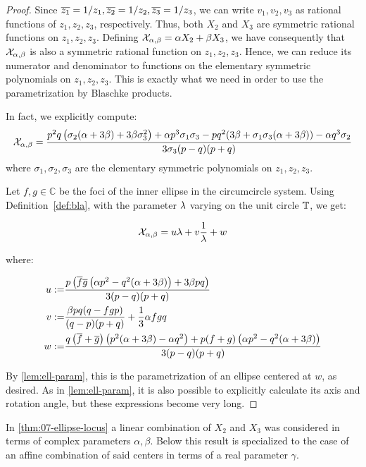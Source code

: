 \begin{proof}
Since $\overline{z_1}=1/z_1,\overline{z_2}=1/z_2,\overline{z_3}=1/z_3$, we can write $v_1,v_2,v_3$ as rational functions of $z_1,z_2,z_3$, respectively. Thus, both $X_2$ and $X_3$ are symmetric rational functions on $z_1,z_2,z_3$. Defining $\mathcal{X}_{\alpha,\beta}=\alpha X_2+\beta X_3$, we have consequently that $\mathcal{X}_{\alpha,\beta}$ is also a symmetric rational function on $z_1,z_2,z_3$. Hence, we can reduce its numerator and denominator to functions on the elementary symmetric polynomials on $z_1,z_2,z_3$. This is exactly what we need in order to use the parametrization by Blaschke products.

In fact, we explicitly compute:
\[  \mathcal{X}_{\alpha,\beta}= \frac{p^2 q \left(\sigma_2 (\alpha +3 \beta )+3 \beta  \sigma_3^2\right)+\alpha  p^3 \sigma_1 \sigma_3-p q^2 (3 \beta +\sigma_1 \sigma_3 (\alpha +3 \beta ))-\alpha  q^3 \sigma_2}{3 \sigma_3 (p-q) (p+q)}\]
where $\sigma_1,\sigma_2,\sigma_3$ are the elementary symmetric polynomials on $z_1,z_2,z_3$.

Let $f,g\in\mathbb{C}$ be the foci of the inner ellipse in the circumcircle system. Using Definition~\ref{def:bla}, with the parameter $\lambda$ varying on the unit circle $\mathbb{T}$, we get:

\begin{equation}
\mathcal{X}_{\alpha,\beta}= u \lambda+v\frac{1}{\lambda}+w
\label{eqn:xi-param}
\end{equation}

\noindent where:

\begin{align*}
    u:=&\frac{p \left(\overline{f} \overline{g} \left(\alpha  p^2-q^2 (\alpha +3 \beta )\right)+3 \beta  p q\right)}{3 (p-q) (p+q)}\\
    v:=&\frac{\beta  p q (q-f g p)}{(q-p) (p+q)}+\frac{1}{3} \alpha  f g q\\
    w:=&\frac{q \left(\overline{f}+\overline{g}\right) \left(p^2 (\alpha +3 \beta )-\alpha  q^2\right)+p (f+g) \left(\alpha  p^2-q^2 (\alpha +3 \beta )\right)}{3 (p-q) (p+q)}
\end{align*}

By   \cref{lem:ell-param}, this is the parametrization of an ellipse centered at $w$, as desired. As in  \cref{lem:ell-param}, it is also possible to explicitly calculate its axis and rotation angle, but these expressions become very long.
\end{proof}

In \cref{thm:07-ellipse-locus} a linear combination of $X_2$ and $X_3$ was considered in terms of complex parameters $\alpha,\beta$. Below this result is specialized to the case of an affine combination of said centers in terms of a real parameter $\gamma$.


